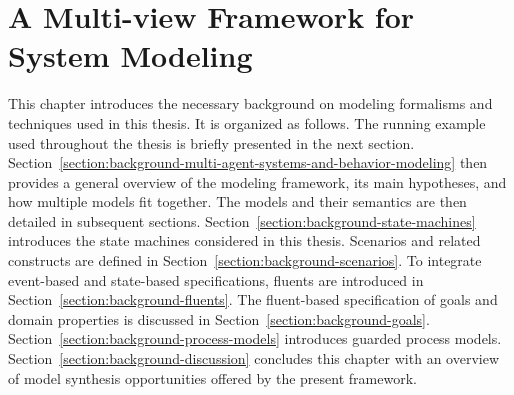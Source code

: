 \chapter{A Multi-view Framework for System Modeling\label{chapter:framework}}

This chapter introduces the necessary background on modeling formalisms and techniques used in this thesis. It is organized as follows. The running example used throughout the thesis is briefly presented in the next section. Section~\ref{section:background-multi-agent-systems-and-behavior-modeling} then provides a general overview of the modeling framework, its main hypotheses, and how multiple models fit together. The models and their semantics are then detailed in subsequent sections. Section~\ref{section:background-state-machines} introduces the state machines considered in this thesis. Scenarios and related constructs are defined in Section~\ref{section:background-scenarios}. To integrate event-based and state-based specifications, fluents are introduced in Section~\ref{section:background-fluents}. The fluent-based specification of goals and domain properties is discussed in Section~\ref{section:background-goals}. Section~\ref{section:background-process-models} introduces guarded process models. Section~\ref{section:background-discussion} concludes this chapter with an overview of model synthesis opportunities offered by the present framework.









